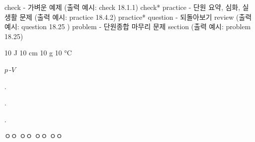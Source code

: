 





check - 가벼운 예제 (출력 예시: check 18.1.1)
check* 
practice - 단원 요약, 심화, 실생활 문제 (출력 예시: practice 18.4.2)
practice*
question - 되돌아보기 review (출력 예시: question 18.25 )
problem - 단원종합 마무리 문제 section (출력 예시: problem 18.25)





10 J 		
10 cm		
10 g		
10 °C       

$p\,$-$V$







                    {
\begin{problembox}{\thechapter. \ProblemNumberumber}


\end{problembox}

\begin{problembox}{\thechapter. \ProblemNumberumber}


\end{problembox}

\begin{solbox}{\thechapter. \ProblemNumberumber}
\bnset
{}


\bn \zzz

\bnset
{}
\bn \zzz

\bnset
{}
\bn \zzz

 ㅇㅇ \zzz
{} ㅇㅇ \zzz
{} ㅇㅇ \zzz
{} ㅇㅇ
\end{solbox}
\clearpage}






